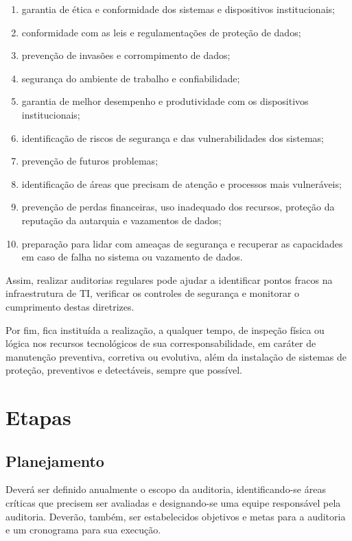 \documentclass[openright, twoside, a4paper]{memoir}
\begin{document}
\begin{enumerate}

\item
    garantia de ética e conformidade dos sistemas e dispositivos
    institucionais;
\item
    conformidade com as leis e regulamentações de proteção de dados;
\item
    prevenção de invasões e corrompimento de dados;
\item
    segurança do ambiente de trabalho e confiabilidade;
\item
    garantia de melhor desempenho e produtividade com os dispositivos
    institucionais;
\item
    identificação de riscos de segurança e das vulnerabilidades dos
    sistemas;
\item
    prevenção de futuros problemas;
\item
    identificação de áreas que precisam de atenção e processos mais
    vulneráveis;
\item
    prevenção de perdas financeiras, uso inadequado dos recursos, proteção
    da reputação da autarquia e vazamentos de dados;
\item
    preparação para lidar com ameaças de segurança e recuperar as
    capacidades em caso de falha no sistema ou vazamento de dados.
\end{enumerate}

Assim, realizar auditorias regulares pode ajudar a identificar pontos
fracos na infraestrutura de TI, verificar os controles de segurança e
monitorar o cumprimento destas diretrizes.

Por fim, fica instituída a realização, a qualquer tempo, de inspeção
física ou lógica nos recursos tecnológicos de sua corresponsabilidade,
em caráter de manutenção preventiva, corretiva ou evolutiva, além da
instalação de sistemas de proteção, preventivos e detectáveis, sempre
que possível.

\section{Etapas}

\subsection{Planejamento}

Deverá ser definido anualmente o escopo da auditoria, identificando-se
áreas críticas que precisem ser avaliadas e designando-se uma equipe
responsável pela auditoria. Deverão, também, ser estabelecidos objetivos
e metas para a auditoria e um cronograma para sua execução.
\end{document}

